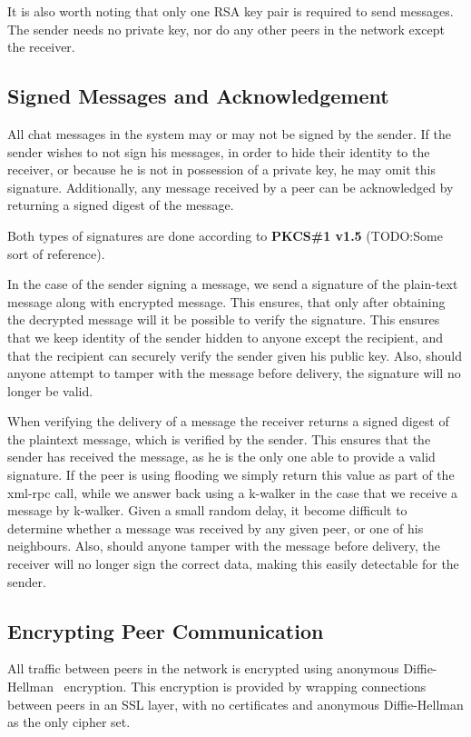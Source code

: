 It is also worth noting that only one RSA key pair is required to send messages. The sender needs no private key, nor do any other peers in the network except the receiver.

\subsection{Signed Messages and Acknowledgement}

All chat messages in the system may or may not be signed by the sender. If the sender wishes to not sign his messages, in order to hide their identity to the receiver, or because he is not in possession of a private key, he may omit this signature. Additionally, any message received by a peer can be acknowledged by returning a signed digest of the message.

Both types of signatures are done according to \textbf{PKCS\#1 v1.5} (TODO:Some sort of reference).

In the case of the sender signing a message, we send a signature of the plain-text message along with encrypted message. This ensures, that only after obtaining the decrypted message will it be possible to verify the signature. This ensures that we keep identity of the sender hidden to anyone except the recipient, and that the recipient can securely verify the sender given his public key. Also, should anyone attempt to tamper with the message before delivery, the signature will no longer be valid.

When verifying the delivery of a message the receiver returns a signed digest of the plaintext message, which is verified by the sender. This ensures that the sender has received the message, as he is the only one able to provide a valid signature. If the peer is using flooding we simply return this value as part of the xml-rpc call, while we answer back using a k-walker in the case that we receive a message by k-walker. Given a small random delay, it become difficult to determine whether a message was received by any given peer, or one of his neighbours. Also, should anyone tamper with the message before delivery, the receiver will no longer sign the correct data, making this easily detectable for the sender.

\subsection{Encrypting Peer Communication}

All traffic between peers in the network is encrypted using anonymous Diffie-Hellman~\citep{DH} encryption. This encryption is provided by wrapping connections between peers in an SSL layer, with no certificates and anonymous Diffie-Hellman as the only cipher set.

